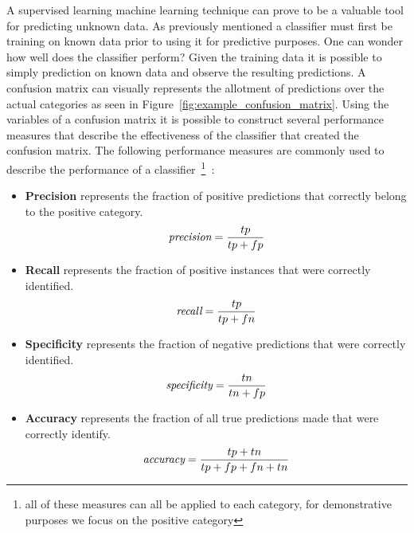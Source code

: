 A supervised learning machine learning technique can prove to be a valuable tool for predicting unknown data. As previously mentioned a classifier must first be training on known data prior to using it for predictive purposes. One can wonder how well does the classifier perform? Given the training data it is possible to simply prediction on known data and observe the resulting predictions. A confusion matrix can visually represents the allotment of predictions over the actual categories as seen in Figure~\ref{fig:example_confusion_matrix}. Using the variables of a confusion matrix it is possible to construct several performance measures that describe the effectiveness of the classifier that created the confusion matrix. The following performance measures are commonly used to describe the performance of a classifier~\footnote{all of these measures can all be applied to each category, for demonstrative purposes we focus on the positive category}~\cite{SJS06}:

\begin{itemize}
  \item \textbf{Precision} represents the fraction of positive predictions that correctly belong to the positive category.
  \begin{equation}
    \emph{$\text{precision} = \frac{tp}{tp + fp}$}
    \label{equ:precision}
  \end{equation}

  \item \textbf{Recall} represents the fraction of positive instances that were correctly identified.
  \begin{equation}
    \emph{$\text{recall} = \frac{tp}{tp + fn}$}
    \label{equ:recall}
  \end{equation}

  \item \textbf{Specificity} represents the fraction of negative predictions that were correctly identified.
  \begin{equation}
    \emph{$\text{specificity} = \frac{tn}{tn + fp}$}
    \label{equ:specificity}
  \end{equation}

  \item \textbf{Accuracy} represents the fraction of all true predictions made that were correctly identify.
  \begin{equation}
    \emph{$\text{accuracy} = \frac{tp + tn}{tp + fp + fn + tn}$}
    \label{equ:accuracy}
  \end{equation}
\end{itemize}


